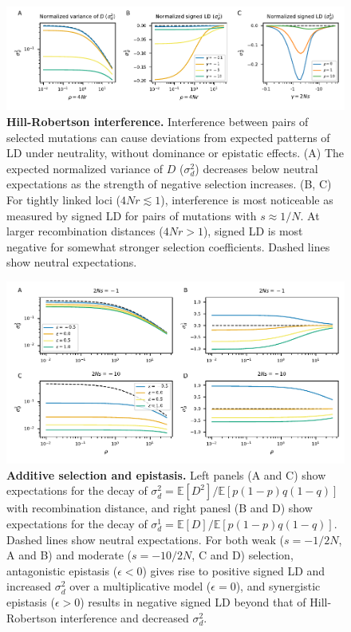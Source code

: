 \documentclass[]{article}
\newcommand{\E}{\mathbb{E}}
\begin{document}
\begin{figure}[tb!]
    \centering
    \includegraphics{../figures/hill_robertson}
    \caption{
        \textbf{Hill-Robertson interference.}
        Interference between pairs of selected mutations can cause deviations
        from expected patterns of LD under neutrality, without dominance
        or epistatic effects.
        (A) The expected normalized variance of $D$ (\(\sigma_d^2\))
        decreases below neutral expectations
        as the strength of negative selection increases.
        (B, C) For tightly linked loci (\(4Nr \lesssim 1\)), interference is most
        noticeable as measured by signed LD for pairs of mutations with
        \(s \approx 1/N\).
        At larger recombination distances (\(4Nr > 1\)), signed LD is most
        negative for somewhat stronger selection coefficients.
        Dashed lines show neutral expectations.
    }
    \label{fig:HillRobertson}
\end{figure}

\begin{figure}[tb!]
    \centering
    \includegraphics{../figures/epistasis_prediction}
    \caption{
        \textbf{Additive selection and epistasis.}
        Left panels (A and C) show expectations for the decay of
        \(\sigma_d^2 = \E[D^2] / \E[p(1-p)q(1-q)]\) with recombination
        distance, and right panesl (B and D) show expectations for the
        decay of \(\sigma_d^1 = \E[D] / \E[p(1-p)q(1-q)]\). Dashed lines
        show neutral expectations.
        For both weak (\(s=-1/2N\), A and B) and moderate
        (\(s=-10/2N\), C and D) selection,
        antagonistic epistasis (\(\epsilon < 0\))
        gives rise to positive signed LD and increased $\sigma_d^2$ over
        a multiplicative model (\(\epsilon = 0\)),
        and synergistic epistasis (\(\epsilon > 0\)) results in negative signed
        LD beyond that of Hill-Robertson interference and decreased \(\sigma_d^2\).
    }
    \label{fig:epistasis}
\end{figure}
\end{document}
